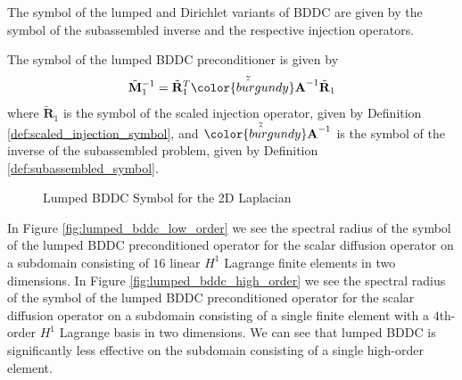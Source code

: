 The symbol of the lumped and Dirichlet variants of BDDC are given by the symbol of the subassembled inverse and the respective injection operators.

\begin{definition}
The symbol of the lumped BDDC preconditioner is given by
\begin{equation}
\tilde{\mathbf{M}}^{-1}_1 = \tilde{\mathbf{R}}^T_1 \tilde{\hat{{\color{burgundy}\mathbf{A}}}}^{-1} \tilde{\mathbf{R}}_1
\end{equation}
where $\tilde{\mathbf{R}}_1$ is the symbol of the scaled injection operator, given by Definition \ref{def:scaled_injection_symbol}, and $\tilde{\hat{{\color{burgundy}\mathbf{A}}}}^{-1}$ is the symbol of the inverse of the subassembled problem, given by Definition \ref{def:subassembled_symbol}. 
\label{def:lumped_bddc_symbol}
\end{definition}

\begin{figure}[!ht]
  \centering
  \hfill
  \caption{Lumped BDDC Symbol for the 2D Laplacian}
\end{figure}

In Figure \ref{fig:lumped_bddc_low_order} we see the spectral radius of the symbol of the lumped BDDC preconditioned operator for the scalar diffusion operator on a subdomain consisting of $16$ linear $H^1$ Lagrange finite elements in two dimensions.
In Figure \ref{fig:lumped_bddc_high_order} we see the spectral radius of the symbol of the lumped BDDC preconditioned operator for the scalar diffusion operator on a subdomain consisting of a single finite element with a $4$th-order $H^1$ Lagrange basis in two dimensions.
We can see that lumped BDDC is significantly less effective on the subdomain consisting of a single high-order element.

